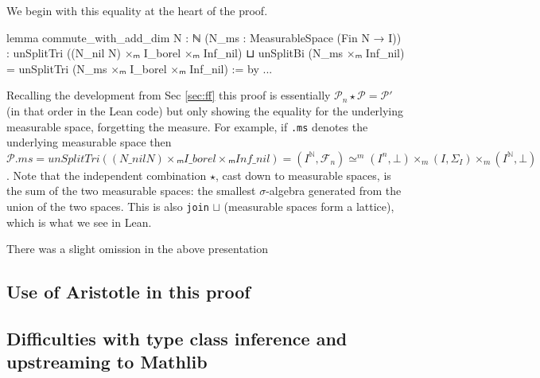 We begin with this equality at the heart of the proof.
\begin{leancode}
lemma commute_with_add_dim {N : ℕ} (N_ms : MeasurableSpace (Fin N → I))
    : unSplitTri ((N_nil N) ×ₘ I_borel ×ₘ Inf_nil) ⊔ unSplitBi (N_ms ×ₘ Inf_nil)
      = unSplitTri (N_ms ×ₘ I_borel ×ₘ Inf_nil) := by ...
\end{leancode}
Recalling the development from Sec \ref{sec:ff} this proof is essentially $\mathcal{P}_n \star \mathcal{P} = \mathcal{P'}$ (in that order in the Lean code) but only showing the
equality for the underlying measurable space, forgetting the measure. For example, if \texttt{.ms} denotes the underlying measurable space then
$\mathcal{P}.ms = unSplitTri ((N\_nil N) ×ₘ I\_borel ×ₘ Inf\_nil) = (I^\mathbb{N}, \mathcal{F}_n) \simeq^m (I^n, \bot) \times_m (I, \Sigma_I) \times_m (I^\mathbb{N}, \bot)$.
Note that the independent combination $\star$, cast down to measurable spaces, is the sum of the two measurable spaces: the smallest $\sigma$-algebra generated from the union
of the two spaces. This is also \texttt{join} $\sqcup$ (measurable spaces form a lattice), which is what we see in Lean.

There was a slight omission in the above presentation

\subsection{Use of Aristotle in this proof}

\subsection{Difficulties with type class inference and upstreaming to Mathlib}







